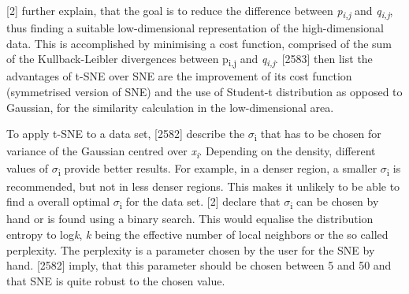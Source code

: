 \textcite{hinton2003stochastic}[2] further explain, that the goal is to reduce the difference between \textit{p\textsubscript{i,j}} and \textit{q\textsubscript{i,j}}, thus finding a suitable low-dimensional representation of the high-dimensional data. This is accomplished by minimising a cost function, comprised of the sum of the Kullback-Leibler divergences between {p\textsubscript{i,j}} and \textit{q\textsubscript{i,j}}. 
\textcite{maaten2008visualizing}[2583] then list the advantages of t-SNE over SNE are the improvement of its cost function (symmetrised version of SNE) and the use of Student-t distribution as opposed to Gaussian, for the similarity calculation in the low-dimensional area.

To apply t-SNE to a data set, \textcite{maaten2008visualizing}[2582] describe the $\sigma$\textsubscript{i} that has to be chosen for variance of the Gaussian centred over \textit{x\textsubscript{i}}. Depending on the density, different values of $\sigma$\textsubscript{i} provide better results. For example, in a denser region, a smaller $\sigma$\textsubscript{i} is recommended, but not in less denser regions. This makes it unlikely to be able to find a overall optimal  $\sigma$\textsubscript{i} for the data set. \textcite{hinton2003stochastic}[2] declare that $\sigma$\textsubscript{i} can be chosen by hand or is found using a binary search. This would equalise the distribution entropy to log\textit{k}, \textit{k} being the effective number of local neighbors or the so called perplexity. The perplexity is a parameter chosen by the user for the SNE by hand. \textcite{maaten2008visualizing}[2582] imply, that this parameter should be chosen between 5 and 50 and that SNE is quite robust to the chosen value. 



